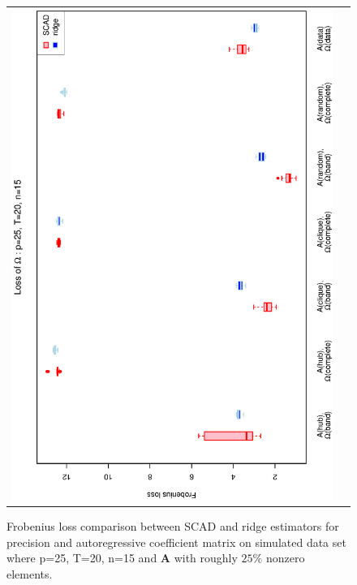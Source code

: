 \begin{figure}[h!]
\begin{tabular}{cc}
\includegraphics[scale=0.45,angle=270]{LossOmega25T20N15_25.eps}
\end{tabular}
\caption{Frobenius loss comparison between SCAD and ridge estimators for precision and autoregressive coefficient matrix on simulated data set where p=25, T=20, n=15  and $\mathbf{A}$ with roughly $25\%$ nonzero elements.}
\label{figSM:Loss25T20N15_25}
\end{figure}



